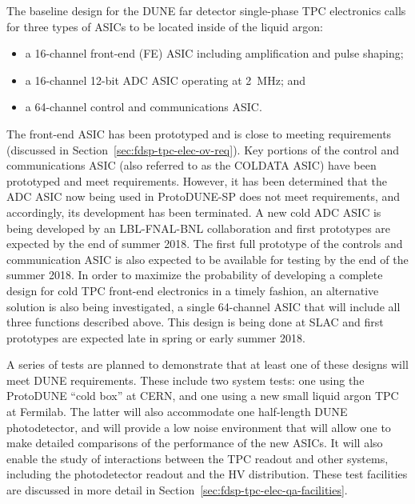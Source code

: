 The baseline design for the DUNE far detector single-phase TPC electronics calls for three types of ASICs to be located inside of the liquid argon:
\begin{itemize}
\item{a 16-channel front-end (FE) ASIC including amplification and pulse shaping;}
\item{a 16-channel 12-bit ADC ASIC operating at 2~MHz; and}
\item{a 64-channel control and communications ASIC.}
\end{itemize}
The front-end ASIC has been prototyped and is close to meeting requirements (discussed in Section~\ref{sec:fdsp-tpc-elec-ov-req}).  Key portions of the control and communications ASIC (also referred to as the COLDATA ASIC) have been prototyped and meet requirements.  However, it has been determined that the ADC ASIC now being used in ProtoDUNE-SP does not meet requirements, and accordingly, its development has been terminated.  A new cold ADC ASIC is being developed by an LBL-FNAL-BNL collaboration and first prototypes are expected by the end of summer 2018.  The first full prototype of the controls and communication ASIC is also expected to be available for testing by the end of the summer 2018.  In order to maximize the probability of developing a complete design for cold TPC front-end electronics in a timely fashion, an alternative solution is also being investigated, a single 64-channel ASIC that will include all three functions described above.  This design is being done at SLAC and first prototypes are expected late in spring or early summer 2018.

A series of tests are planned to demonstrate that at least one of these designs will meet DUNE requirements. These include two system tests: one using the ProtoDUNE ``cold box'' at CERN, and one using a new small liquid argon TPC at Fermilab. The latter will also accommodate one half-length DUNE photodetector, and will provide a low noise environment that will allow one to make detailed comparisons of the performance of the new ASICs. It will also enable the study of interactions between the TPC readout and other systems, including the photodetector readout and the HV distribution.  These test facilities are discussed in more detail in Section~\ref{sec:fdsp-tpc-elec-qa-facilities}.
